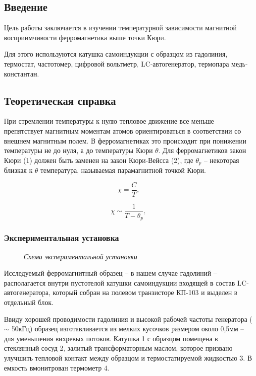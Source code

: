		
\subsection*{Введение}

Цель работы заключается в изучении температурной зависимости магнитной восприимчивости ферромагнетика выше точки Кюри.

Для этого используются катушка самоиндукции с образцом из гадолиния, термостат, частотомер, цифровой вольтметр, LC-автогенератор, термопара медь-константан.

\subsection*{Теоретическая справка}

При стремлении температуры к нулю тепловое движение все меньше препятствует магнитным моментам атомов ориентироваться в соответствии со внешнем магнитным полем. В ферромагнетиках это происходит при понижении температуры не до нуля, а до температуры Кюри $\theta$. Для ферромагнетиков закон Кюри (1) должен быть заменен на закон Кюри-Вейсса (2), где $\theta_p$ -- некоторая близкая к $\theta$ температура, называемая парамагнитной точкой Кюри. 

\begin{equation}
	\chi = \frac{C}{T},
\end{equation}

\begin{equation}
	\chi \sim \frac{1}{T - \theta_p},
\end{equation}

\subsubsection*{Экспериментальная установка}

\begin{figure}[hbt]\label{risI}
    \caption{\textit{Схема экспериментальной установки}}
\end{figure}

Исследуемый ферромагнитный образец -- в нашем случае гадолиний -- располагается внутри пустотелой катушки самоиндукции входящей в состав LC-автогенератора, который собран на полевом транзисторе КП-103 и выделен в отдельный блок. 

Ввиду хорошей проводимости гадолиния и высокой рабочей частоты генератора ($\sim$ 50кГц) образец изготавливается из мелких кусочков размером около 0,5мм -- для уменьшения вихревых потоков. Катушка 1 с образцом помещена в стеклянный сосуд 2, залитый трансформаторным маслом, которое призвано улучшить тепловой контакт между образцом и термостатируемой жидкостью 3. В емкость вмонитрован термометр 4.

